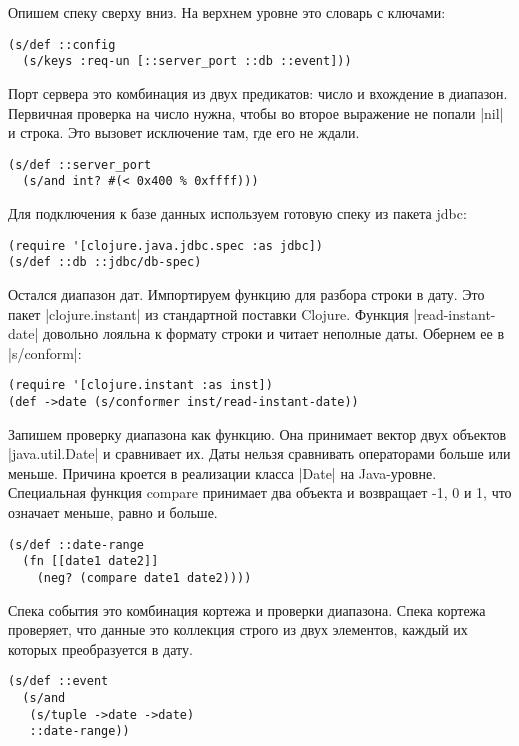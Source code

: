 Опишем спеку сверху вниз. На верхнем уровне это словарь с ключами:

\begin{verbatim}
(s/def ::config
  (s/keys :req-un [::server_port ::db ::event]))
\end{verbatim}

Порт сервера это комбинация из двух предикатов: число и вхождение в
диапазон. Первичная проверка на число нужна, чтобы во второе выражение не попали
\spverb|nil| и строка. Это вызовет исключение там, где его не ждали.

\begin{verbatim}
(s/def ::server_port
  (s/and int? #(< 0x400 % 0xffff)))
\end{verbatim}

Для подключения к базе данных используем готовую спеку из пакета jdbc:

\begin{verbatim}
(require '[clojure.java.jdbc.spec :as jdbc])
(s/def ::db ::jdbc/db-spec)
\end{verbatim}

Остался диапазон дат. Импортируем функцию для разбора строки в дату. Это пакет
\spverb|clojure.instant| из стандартной поставки Clojure. Функция \spverb|read-instant-date|
довольно лояльна к формату строки и читает неполные даты. Обернем ее в
\spverb|s/conform|:

\begin{verbatim}
(require '[clojure.instant :as inst])
(def ->date (s/conformer inst/read-instant-date))
\end{verbatim}

Запишем проверку диапазона как функцию. Она принимает вектор двух объектов
\spverb|java.util.Date| и сравнивает их. Даты нельзя сравнивать операторами больше или
меньше. Причина кроется в реализации класса \spverb|Date| на Java-уровне. Специальная
функция compare принимает два объекта и возвращает -1, 0 и 1, что означает
меньше, равно и больше.

\begin{verbatim}
(s/def ::date-range
  (fn [[date1 date2]]
    (neg? (compare date1 date2))))
\end{verbatim}

Спека события это комбинация кортежа и проверки диапазона. Спека кортежа
проверяет, что данные это коллекция строго из двух элементов, каждый их которых
преобразуется в дату.

\begin{verbatim}
(s/def ::event
  (s/and
   (s/tuple ->date ->date)
   ::date-range))
\end{verbatim}

